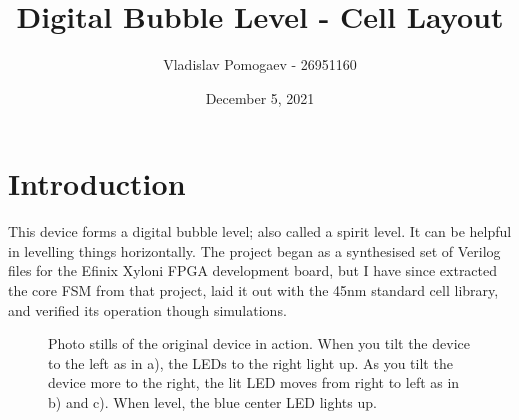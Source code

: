 \documentclass[11pt]{article}
\title{Digital Bubble Level - Cell Layout}
\author{Vladislav Pomogaev - 26951160}
\date{December 5, 2021}
\begin{document}
\maketitle

\section{Introduction}
This device forms a digital bubble level; also called a spirit level. It can be helpful in levelling things horizontally. The project began as a synthesised set of Verilog files for the Efinix Xyloni FPGA development board, but I have since extracted the core FSM from that project, laid it out with the 45nm standard cell library, and verified its operation though simulations.
\begin{figure}[H]
    \centering
    \caption{Photo stills of the original device in action. When you tilt the device to the left as in a), the LEDs to the right light up. As you tilt the device more to the right, the lit LED moves from right to left as in b) and c). When level, the blue center LED lights up.}
\end{figure}
\end{document}
